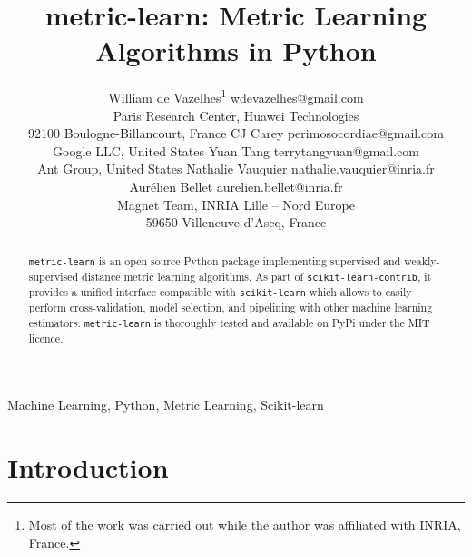 \documentclass[twoside,11pt]{article}
\begin{document}
\title{metric-learn: Metric Learning Algorithms in Python}

\author{\name William de Vazelhes\thanks{Most of the work was carried out while the author was affiliated with INRIA, France.} \email wdevazelhes@gmail.com \\
       \addr Paris Research Center, Huawei Technologies\\
       92100 Boulogne-Billancourt, France
       \AND
       \name CJ Carey \email perimosocordiae@gmail.com \\
       \addr Google LLC, United States
       \AND
       \name Yuan Tang \email terrytangyuan@gmail.com \\
       \addr Ant Group, United States
       \AND
       \name Nathalie Vauquier \email nathalie.vauquier@inria.fr \\
       \name Aur\'elien Bellet \email aurelien.bellet@inria.fr \\
       \addr Magnet Team, INRIA Lille – Nord Europe\\
       59650 Villeneuve d’Ascq, France
       }


\maketitle

\begin{abstract}%
\texttt{metric-learn} is an open source Python package implementing supervised and weakly-supervised distance metric learning algorithms. As part of \texttt{scikit-learn-contrib}, it provides a unified interface compatible with \texttt{scikit-learn} which allows to easily perform cross-validation, model selection, and pipelining with other machine learning estimators. \texttt{metric-learn} is thoroughly tested and available on PyPi under the MIT licence.
\end{abstract}

\begin{keywords}
  Machine Learning, Python, Metric Learning, Scikit-learn
\end{keywords}

\section{Introduction}
\end{document}
